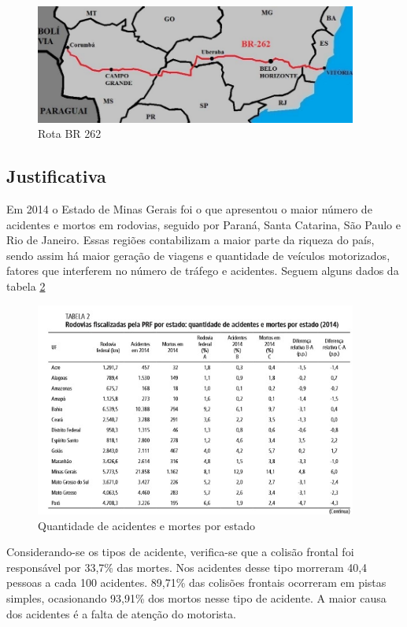 \begin{figure}[h]
  \centering
  \includegraphics[width=400px, scale=0.5]{figuras/mapa}
  \caption{Rota BR 262}
  \label{table:mapa}
\end{figure}

\subsection{Justificativa}
Em 2014 o Estado de Minas Gerais foi o que apresentou o maior número de acidentes
e mortos em rodovias, seguido por Paraná, Santa Catarina, São Paulo e Rio de
Janeiro. Essas regiões contabilizam a maior parte da riqueza do país, sendo assim
há maior geração de viagens e quantidade de veículos motorizados, fatores que
interferem no número de tráfego e acidentes. Seguem alguns dados da tabela \ref{table:tabelaacidentes}


\begin{figure}[h]
  \centering
  \includegraphics[width=400px, scale=0.5]{figuras/tabelaacidentes}
  \caption{Quantidade de acidentes e mortes por estado}
  \label{table:tabelaacidentes}
\end{figure}

Considerando-se os tipos de acidente, verifica-se que a colisão frontal foi responsável
por 33,7\% das mortes. Nos acidentes desse tipo morreram 40,4 pessoas a cada 100
acidentes. 89,71\% das colisões frontais ocorreram em pistas simples, ocasionando
93,91\% dos mortos nesse tipo de acidente. A maior causa dos acidentes é a falta
de atenção do motorista.

